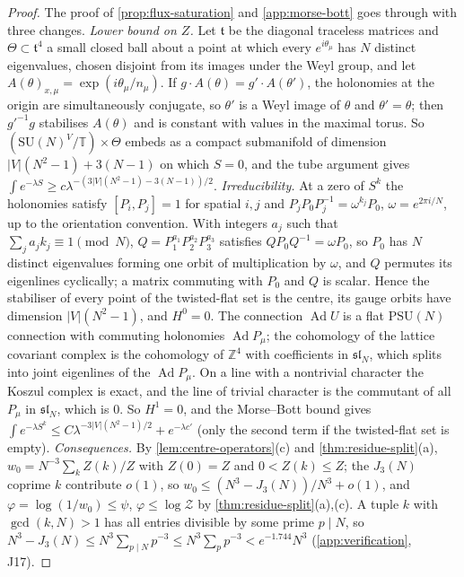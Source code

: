 \documentclass[11pt,a4paper]{amsart}
\theoremstyle{definition}
\theoremstyle{remark}
\numberwithin{equation}{section}
\newcommand{\Z}{\mathbb{Z}}          %
\newcommand{\abs}[1]{\lvert #1\rvert}      %
\newcommand{\SU}{\mathrm{SU}}              %
\newcommand{\TT}{\mathbb{T}}               %
\newcommand{\Zc}{\mathcal{Z}}              %
\begin{document}
\begin{proof}
The proof of \cref{prop:flux-saturation} and \cref{app:morse-bott} goes through with three changes. \emph{Lower bound on $Z$.} Let $\mathfrak t$ be the diagonal traceless matrices and $\Theta\subset\mathfrak t^4$ a small closed ball about a point at which every $e^{i\theta_\mu}$ has $N$ distinct eigenvalues, chosen disjoint from its images under the Weyl group, and let $A(\theta)_{x,\mu}=\exp(i\theta_\mu/n_\mu)$. If $g\cdot A(\theta)=g'\cdot A(\theta')$, the holonomies at the origin are simultaneously conjugate, so $\theta'$ is a Weyl image of $\theta$ and $\theta'=\theta$; then $g'^{-1}g$ stabilises $A(\theta)$ and is constant with values in the maximal torus. So $(\SU(N)^V/\mathbb T)\times\Theta$ embeds as a compact submanifold of dimension $\abs V(N^2-1)+3(N-1)$ on which $S=0$, and the tube argument gives $\int e^{-\lambda S}\ge c\lambda^{-(3\abs V(N^2-1)-3(N-1))/2}$. \emph{Irreducibility.} At a zero of $S^k$ the holonomies satisfy $[P_i,P_j]=1$ for spatial $i,j$ and $P_jP_0P_j^{-1}=\omega^{k_j}P_0$, $\omega=e^{2\pi i/N}$, up to the orientation convention. With integers $a_j$ such that $\sum_ja_jk_j\equiv1\pmod N$, $Q=P_1^{a_1}P_2^{a_2}P_3^{a_3}$ satisfies $QP_0Q^{-1}=\omega P_0$, so $P_0$ has $N$ distinct eigenvalues forming one orbit of multiplication by $\omega$, and $Q$ permutes its eigenlines cyclically; a matrix commuting with $P_0$ and $Q$ is scalar. Hence the stabiliser of every point of the twisted-flat set is the centre, its gauge orbits have dimension $\abs V(N^2-1)$, and $H^0=0$. The connection $\operatorname{Ad}U$ is a flat $\mathrm{PSU}(N)$ connection with commuting holonomies $\operatorname{Ad}P_\mu$; the cohomology of the lattice covariant complex is the cohomology of $\Z^4$ with coefficients in $\mathfrak{sl}_N$, which splits into joint eigenlines of the $\operatorname{Ad}P_\mu$. On a line with a nontrivial character the Koszul complex is exact, and the line of trivial character is the commutant of all $P_\mu$ in $\mathfrak{sl}_N$, which is $0$. So $H^1=0$, and the Morse--Bott bound gives $\int e^{-\lambda S^k}\le C\lambda^{-3\abs V(N^2-1)/2}+e^{-\lambda c'}$ (only the second term if the twisted-flat set is empty). \emph{Consequences.} By \cref{lem:centre-operators}(c) and \cref{thm:residue-split}(a), $w_0=N^{-3}\sum_kZ(k)/Z$ with $Z(0)=Z$ and $0<Z(k)\le Z$; the $J_3(N)$ coprime $k$ contribute $o(1)$, so $w_0\le(N^3-J_3(N))/N^3+o(1)$, and $\varphi=\log(1/w_0)\le\psi$, $\varphi\le\log\Zc$ by \cref{thm:residue-split}(a),(c). A tuple $k$ with $\gcd(k,N)>1$ has all entries divisible by some prime $p\mid N$, so $N^3-J_3(N)\le N^3\sum_{p\mid N}p^{-3}\le N^3\sum_pp^{-3}<e^{-1.744}N^3$ (\cref{app:verification}, J17).
\end{proof}
\end{document}
